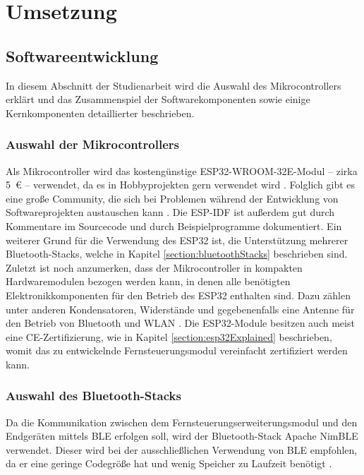 
\chapter{Umsetzung}

\section{Softwareentwicklung}
In diesem Abschnitt der Studienarbeit wird die Auswahl des Mikrocontrollers erklärt und das Zusammenspiel der Softwarekomponenten sowie einige Kernkomponenten detaillierter beschrieben.

\subsection{Auswahl der Mikrocontrollers}
Als Mikrocontroller wird das kostengünstige ESP32-WROOM-32E-Modul -- zirka 5~€ \cite{espressifModules} -- verwendet, da es in Hobbyprojekten gern verwendet wird \cites{redditESP32}{esp32Forum}. Folglich gibt es eine große Community, die sich bei Problemen während der Entwicklung von Softwareprojekten austauschen kann \cites{redditESP32}{esp32Forum}. Die \ac{ESP-IDF} ist außerdem gut durch Kommentare im Sourcecode und durch Beispielprogramme dokumentiert. Ein weiterer Grund für die Verwendung des ESP32 ist, die Unterstützung mehrerer Bluetooth-Stacks, welche in Kapitel \ref{section:bluetoothStacks} beschrieben sind. Zuletzt ist noch anzumerken, dass der Mikrocontroller in kompakten Hardwaremodulen bezogen werden kann, in denen alle benötigten Elektronikkomponenten für den Betrieb des ESP32 enthalten sind. Dazu zählen unter anderen Kondensatoren, Widerstände und gegebenenfalls eine Antenne für den Betrieb von Bluetooth und \acs{WLAN} \cite[S.~14]{espressifHardwareDesignGuidelines}. Die ESP32-Module besitzen auch meist eine CE-Zertifizierung, wie in Kapitel \ref{section:esp32Explained} beschrieben, womit das zu entwickelnde Fernsteuerungsmodul vereinfacht zertifiziert werden kann.

\subsection{Auswahl des Bluetooth-Stacks}
\label{section:bluetoothStackSelection}
Da die Kommunikation zwischen dem Fernsteuerungserweiterungsmodul und den Endgeräten mittels \ac{BLE} erfolgen soll, wird der Bluetooth-Stack Apache NimBLE verwendet. Dieser wird bei der ausschließlichen Verwendung von \ac{BLE} empfohlen, da er eine geringe Codegröße hat und wenig Speicher zu Laufzeit benötigt \cite{espidfBluetoothStack}.


